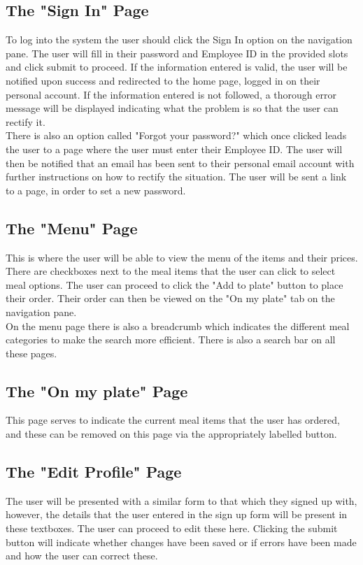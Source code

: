 \documentclass[12pt]{article}
\begin{document}
\subsection{The "Sign In" Page} 
To log into the system the user should click the Sign In option on the navigation pane. The user will fill in their password and Employee ID in the provided slots and click submit to proceed. If the information entered is valid, the user will be notified upon success and redirected to the home page, logged in on their personal account. If the information entered is not followed, a thorough error message will be displayed indicating what the problem is so that the user can rectify it.
\\
There is also an option called "Forgot your password?" which once clicked leads the user to a page where the user must enter their Employee ID. The user will then be notified that an email has been sent to their personal email account with further instructions on how to rectify the situation. The user will be sent a link to a page, in order to set a new password.   

\subsection{The "Menu" Page} 
This is where the user will be able to view the menu of the items and their prices. There are checkboxes next to the meal items that the user can click to select meal options. The user can proceed to click the "Add to plate" button to place their order. Their order can then be viewed on the "On my plate" tab on the navigation pane. 
\\
On the menu page there is also a breadcrumb which indicates the different meal categories to make the search more efficient. There is also a search bar on all these pages. 

\subsection{The "On my plate" Page} 
This page serves to indicate the current meal items that the user has ordered, and these can be removed on this page via the appropriately labelled button.

\subsection{The "Edit Profile" Page} 
The user will be presented with a similar form to that which they signed up with, however, the details that the user entered in the sign up form will be present in these textboxes. The user can proceed to edit these here. Clicking the submit button will indicate whether changes have been saved or if errors have been made and how the user can correct these.
\end{document}
